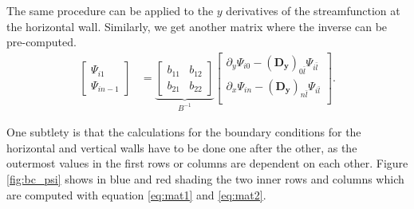 The same procedure can be applied to the $y$ derivatives of the streamfunction
at the horizontal wall. Similarly, we get another matrix where the inverse can
be pre-computed. 
\begin{align}
\begin{bmatrix} \Psi_{i1} \\ \Psi_{in-1}
\end{bmatrix} &=
\underbrace{\begin{bmatrix} b_{11} & b_{12} \\ b_{21} & b_{22} 
\end{bmatrix}}_{B^{-1}}
\begin{bmatrix}
\partial_y\Psi_{i0} - (\mathbf{D_y})_{0\bar{l}}\Psi_{i\bar{l}} \\
\partial_x\Psi_{in} - (\mathbf{D_y})_{n\bar{l}}\Psi_{i\bar{l}} \\
\end{bmatrix}.
\label{eq:mat2}
\end{align}

One subtlety is that the calculations for the boundary conditions for the
horizontal and vertical walls have to be done one after the other, as the
outermost values in the first rows or columns are dependent on each other.
Figure \ref{fig:bc_psi} shows in blue and red shading the two inner rows and
columns which are computed with equation \eqref{eq:mat1} and \eqref{eq:mat2}.

